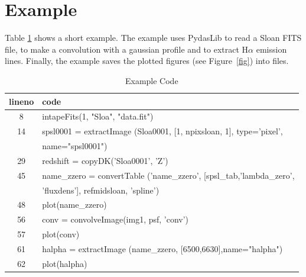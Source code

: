           \section{Example }
Table \ref{code} shows a short example. The example uses PydasLib to read a Sloan FITS file, to make a convolution with a gaussian profile and to extract H$\alpha$ emission lines. Finally, the example saves the plotted figures (see Figure~\ref{fig}) into files.

\begin{table}[!hb]
\begin{center}
\caption{Example Code}
\label{code}
\begin{tabular}{cl}
lineno & code\\
\hline
8 & intapeFits(1, "Sloa", "data.fit")  \\
14 & spsl0001 = extractImage (Sloa0001, [1, npixsloan, 1], type='pixel', \\
  & name="spsl0001")\\
29 & redshift = copyDK('Sloa0001', 'Z')  \\
45 & name\_zzero = convertTable ('name\_zzero', [spsl\_tab,'lambda\_zero',\\
   & 'fluxdens'], refmidsloan, 'spline')\\
48 & plot(name\_zzero)\\
56 & conv = convolveImage(img1, psf, 'conv') \\
57 & plot(conv)\\
61 & halpha = extractImage (name\_zzero, [6500,6630],name="halpha") \\
62 & plot(halpha)\\
\end{tabular}
\end{center}
\end{table}
	 
